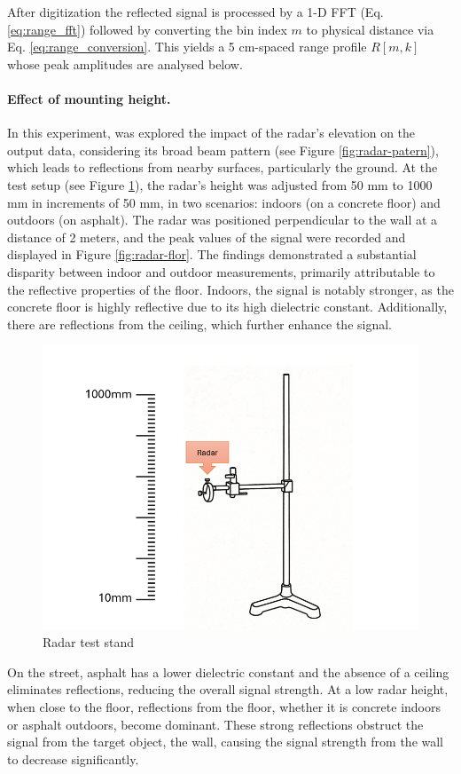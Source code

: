 \noindent
After digitization the reflected signal is processed by a 1-D FFT (Eq. \ref{eq:range_fft})  
followed by converting the bin index $m$ to physical distance via Eq. \ref{eq:range_conversion}.  
This yields a 5 cm-spaced range profile $R[m,k]$ whose peak amplitudes are analysed below.





\paragraph{Effect of mounting height.}
In this experiment, was explored the impact of the radar's elevation on the output data, considering its broad beam pattern (see Figure \ref{fig:radar-patern}), which leads to reflections from nearby surfaces, particularly the ground.
At the test setup (see Figure \ref{fig:radarstand}), the radar's height was adjusted from 50 mm to 1000 mm in increments of 50 mm, in two scenarios: indoors (on a concrete floor) and outdoors (on asphalt). The radar was positioned perpendicular to the wall at a distance of 2 meters, and the peak values of the signal were recorded and displayed in Figure \ref{fig:radar-flor}.
The findings demonstrated a substantial disparity between indoor and outdoor measurements, primarily attributable to the reflective properties of the floor.
Indoors, the signal is notably stronger, as the concrete floor is highly reflective due to its high dielectric constant. Additionally, there are reflections from the ceiling, which further enhance the signal.

\begin{figure}[H]
    \centering
    \includegraphics[width=0.5\linewidth]{Src/images/radarstand.png}
    \caption{Radar test stand}
    \label{fig:radarstand}
\end{figure}

On the street, asphalt has a lower dielectric constant and the absence of a ceiling eliminates reflections, reducing the overall signal strength.
At a low radar height, when close to the floor, reflections from the floor, whether it is concrete indoors or asphalt outdoors, become dominant. These strong reflections obstruct the signal from the target object, the wall, causing the signal strength from the wall to decrease significantly.

